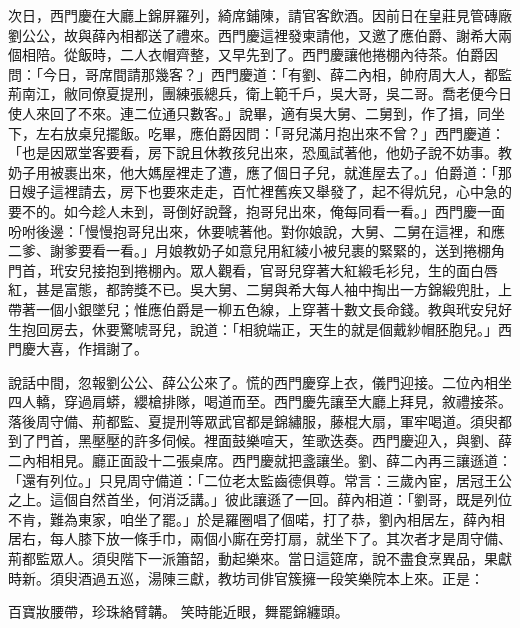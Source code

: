 次日，西門慶在大廳上錦屏羅列，綺席鋪陳，請官客飲酒。因前日在皇莊見管磚廠劉公公，故與薛內相都送了禮來。西門慶這裡發柬請他，又邀了應伯爵、謝希大兩個相陪。從飯時，二人衣帽齊整，又早先到了。西門慶讓他捲棚內待茶。伯爵因問：「今日，哥席間請那幾客？」西門慶道：「有劉、薛二內相，帥府周大人，都監荊南江，敝同僚夏提刑，團練張總兵，衛上範千戶，吳大哥，吳二哥。喬老便今日使人來回了不來。連二位通只數客。」說畢，適有吳大舅、二舅到，作了揖，同坐下，左右放桌兒擺飯。吃畢，應伯爵因問：「哥兒滿月抱出來不曾？」西門慶道：「也是因眾堂客要看，房下說且休教孩兒出來，恐風試著他，他奶子說不妨事。教奶子用被裹出來，他大媽屋裡走了遭，應了個日子兒，就進屋去了。」伯爵道：「那日嫂子這裡請去，房下也要來走走，百忙裡舊疾又舉發了，起不得炕兒，心中急的要不的。如今趁人未到，哥倒好說聲，抱哥兒出來，俺每同看一看。」西門慶一面吩咐後邊：「慢慢抱哥兒出來，休要唬著他。對你娘說，大舅、二舅在這裡，和應二爹、謝爹要看一看。」月娘教奶子如意兒用紅綾小被兒裹的緊緊的，送到捲棚角門首，玳安兒接抱到捲棚內。眾人觀看，官哥兒穿著大紅緞毛衫兒，生的面白唇紅，甚是富態，都誇獎不已。吳大舅、二舅與希大每人袖中掏出一方錦緞兜肚，上帶著一個小銀墜兒；惟應伯爵是一柳五色線，上穿著十數文長命錢。教與玳安兒好生抱回房去，休要驚唬哥兒，說道：「相貌端正，天生的就是個戴紗帽胚胞兒。」西門慶大喜，作揖謝了。

說話中間，忽報劉公公、薛公公來了。慌的西門慶穿上衣，儀門迎接。二位內相坐四人轎，穿過肩蟒，纓槍排隊，喝道而至。西門慶先讓至大廳上拜見，敘禮接茶。落後周守備、荊都監、夏提刑等眾武官都是錦繡服，藤棍大扇，軍牢喝道。須臾都到了門首，黑壓壓的許多伺候。裡面鼓樂喧天，笙歌迭奏。西門慶迎入，與劉、薛二內相相見。廳正面設十二張桌席。西門慶就把盞讓坐。劉、薛二內再三讓遜道：「還有列位。」只見周守備道：「二位老太監齒德俱尊。常言：三歲內宦，居冠王公之上。這個自然首坐，何消泛講。」彼此讓遜了一回。薛內相道：「劉哥，既是列位不肯，難為東家，咱坐了罷。」於是羅圈唱了個喏，打了恭，劉內相居左，薛內相居右，每人膝下放一條手巾，兩個小廝在旁打扇，就坐下了。其次者才是周守備、荊都監眾人。須臾階下一派簫韶，動起樂來。當日這筵席，說不盡食烹異品，果獻時新。須臾酒過五巡，湯陳三獻，教坊司俳官簇擁一段笑樂院本上來。正是：

百寶妝腰帶，珍珠絡臂韝。
笑時能近眼，舞罷錦纏頭。

